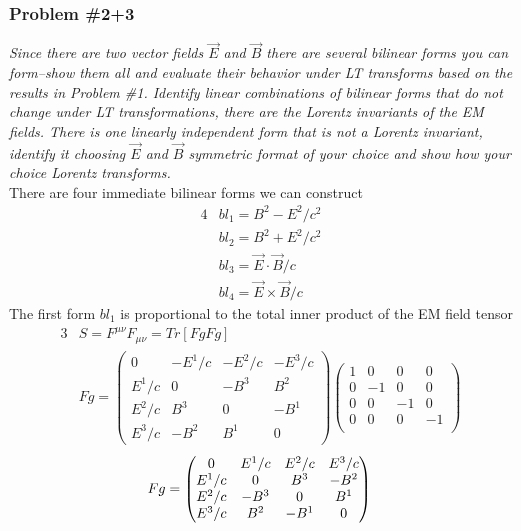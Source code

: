 \documentclass[]{article}
\numberwithin{equation}{subsection}
\begin{document}
\subsubsection*{Problem \#2+3}
\emph{Since there are two vector fields $\vec{E}$ and $\vec{B}$ there are several bilinear forms you can form--show them all and evaluate their behavior under LT transforms based on the results in Problem \#1. Identify linear combinations of bilinear forms that do not change under LT transformations, there are the Lorentz invariants of the EM fields. There is one linearly independent form that is not a Lorentz invariant, identify it choosing $\vec{E}$ and $\vec{B}$ symmetric format of your choice and show how your choice Lorentz transforms.}\\

\noindent There are four immediate bilinear forms we can construct  
\begin{alignat}{4}
	\label{g14}	&bl_{1}=B^{2}-E^{2}/c^{2}\\
	\label{g15}	&bl_{2}=B^{2}+E^{2}/c^{2}\\
	\label{g16}	&bl_{3}=\vec{E}\cdot\vec{B}/c\\
	\label{g17}	&bl_{4}=\vec{E}\times\vec{B}/c
\end{alignat}
The first form $bl_{1}$ is proportional to the total inner product of the EM field tensor  
\begin{alignat}{3}
	\label{g18}	&S=F^{\mu\nu}F_{\mu\nu}=Tr[FgFg]\\
	\label{g19}	&Fg=
	\begin{pmatrix}
		0&-E^{1}/c&-E^{2}/c&-E^{3}/c\\
		E^{1}/c&0&-B^{3}&B^{2}\\
		E^{2}/c&B^{3}&0&-B^{1}\\
		E^{3}/c&-B^{2}&B^{1}&0	
	\end{pmatrix}
	\begin{pmatrix}
		1&0&0&0\\
		0&-1&0&0\\
		0&0&-1&0\\
		0&0&0&-1\\		
	\end{pmatrix}
\end{alignat}
$$
Fg=
	\begin{pmatrix}
		0&E^{1}/c&E^{2}/c&E^{3}/c\\
		E^{1}/c&0&B^{3}&-B^{2}\\
		E^{2}/c&-B^{3}&0&B^{1}\\
		E^{3}/c&B^{2}&-B^{1}&0	
	\end{pmatrix}\\
$$
\end{document}
